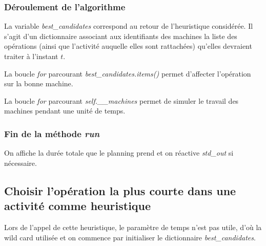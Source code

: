 

\newpage

\subsubsection{Déroulement de l'algorithme}



La variable \textit{best\_candidates} correspond au retour de l'heuristique considérée. Il s'agit d'un dictionnaire associant aux identifiants des machines la liste des opérations (ainsi que l'activité auquelle elles sont rattachées) qu'elles devraient traiter à l'instant $t$.

La boucle \textit{for} parcourant \textit{best\_candidates.items()} permet d'affecter l'opération sur la bonne machine.

La boucle \textit{for} parcourant \textit{self.\_\_machines} permet de simuler le travail des machines pendant une unité de temps.

\subsubsection{Fin de la méthode \textit{run}}



On affiche la durée totale que le planning prend et on réactive \textit{std\_out} si nécessaire. 

\newpage

\subsection{Choisir l'opération la plus courte dans une activité comme heuristique}



Lors de l'appel de cette heuristique, le paramètre de temps n'est pas utile, d'où la wild card utilisée et on commence par initialiser le dictionnaire \textit{best\_candidates}.



